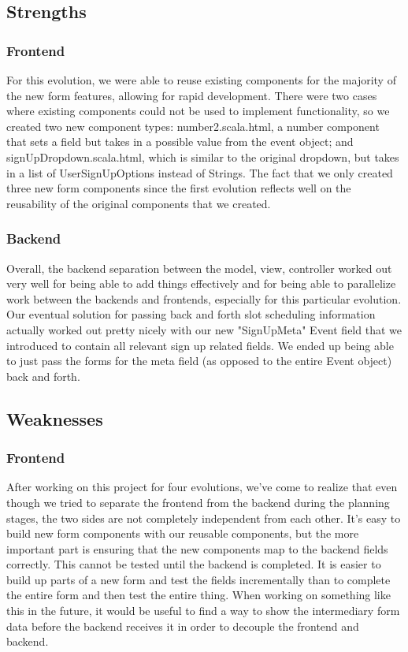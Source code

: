 \documentclass{article}
\begin{document}
\subsection{Strengths}
\subsubsection{Frontend}
For this evolution, we were able to reuse existing components for the majority of the new form features, allowing for rapid development. There were two cases where existing components could not be used to implement functionality, so we created two new component types: number2.scala.html, a number component that sets a field but takes in a possible value from the event object; and signUpDropdown.scala.html, which is similar to the original dropdown, but takes in a list of UserSignUpOptions instead of Strings. The fact that we only created three new form components since the first evolution reflects well on the reusability of the original components that we created.

\subsubsection{Backend}
Overall, the backend separation between the model, view, controller worked out very well for being able to add things effectively and for being able to parallelize work between the backends and frontends, especially for this particular evolution. Our eventual solution for passing back and forth slot scheduling information actually worked out pretty nicely with our new "SignUpMeta" Event field that we introduced to contain all relevant sign up related fields. We ended up being able to just pass the forms for the meta field (as opposed to the entire Event object) back and forth.

\subsection{Weaknesses}

\subsubsection{Frontend}
After working on this project for four evolutions, we’ve come to realize that even though we tried to separate the frontend from the backend during the planning stages, the two sides are not completely independent from each other. It’s easy to build new form components with our reusable components, but the more important part is ensuring that the new components map to the backend fields correctly. This cannot be tested until the backend is completed. It is easier to build up parts of a new form and test the fields incrementally than to complete the entire form and then test the entire thing. When working on something like this in the future, it would be useful to find a way to show the intermediary form data before the backend receives it in order to decouple the frontend and backend.
\end{document}
